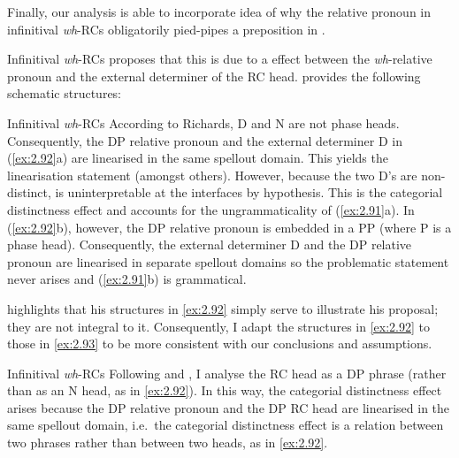 \documentclass[output=paper]{langsci/langscibook}
\begin{document}
Finally, our analysis is able to incorporate  idea of why
the relative pronoun in infinitival
\emph{wh}-\glspl{RC} obligatorily pied-pipes a preposition in
.

\ea\label{ex:2.91} Infinitival \emph{wh}-\glspl{RC}
    \z
\z
\textcite{Richards2010} proposes that this is due to a  effect between the \emph{wh}{-relative pronoun and the external
determiner of the RC head.} \textcite[35]{Richards2010} provides the following
schematic structures:

\ea\label{ex:2.92} Infinitival \emph{wh}-\glspl{RC}
    \z
\z
According to Richards, D and N are not phase heads. Consequently, the DP
relative pronoun and the external determiner D in (\ref{ex:2.92}a) are
linearised in the same spellout domain. This yields the linearisation statement
 (amongst others). However, because the two D’s are non-distinct,
 is uninterpretable at the interfaces by hypothesis. This is the
categorial distinctness effect and accounts for the ungrammaticality of
(\ref{ex:2.91}a). In (\ref{ex:2.92}b), however, the DP relative pronoun
is embedded in a PP (where P is a phase head).  Consequently, the external
determiner D and the DP relative pronoun are linearised in separate spellout
domains so the problematic  statement never arises and
(\ref{ex:2.91}b) is grammatical.

\textcite{Richards2010} highlights that his structures in \eqref{ex:2.92}
simply serve to illustrate his proposal; they are not integral to it.
Consequently, I adapt the structures in \eqref{ex:2.92} to those in
\eqref{ex:2.93} to be more consistent with our conclusions and assumptions.

\ea\label{ex:2.93} Infinitival \emph{wh}-\glspl{RC}
    \z
\z
Following \textcite{Borsley1997} and \textcite{Bianchi2000}, I analyse the
\gls{RC} head as a DP phrase (rather than as an N head, as
in \ref{ex:2.92}). In this way, the categorial distinctness effect arises
because the DP relative pronoun and the DP \gls{RC} head
are linearised in the same spellout domain, i.e.\ the categorial distinctness
effect is a relation between two phrases rather than between two heads, as in
\eqref{ex:2.92}.
\end{document}
